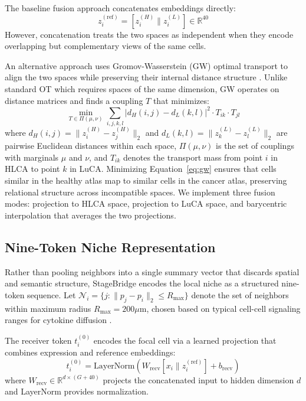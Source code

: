 \documentclass[conference]{IEEEtran}
\begin{document}
The baseline fusion approach concatenates embeddings directly:
\begin{equation}
z_i^{(\text{ref})} = [z_i^{(H)} \| z_i^{(L)}] \in \mathbb{R}^{40}
\label{eq:concat}
\end{equation}
However, concatenation treats the two spaces as independent when they encode overlapping but complementary views of the same cells.

An alternative approach uses Gromov-Wasserstein (GW) optimal transport to align the two spaces while preserving their internal distance structure \cite{Bunne2024-pl}. Unlike standard OT which requires spaces of the same dimension, GW operates on distance matrices and finds a coupling $T$ that minimizes:
\begin{equation}
\min_{T \in \Pi(\mu, \nu)} \sum_{i,j,k,l} |d_H(i,j) - d_L(k,l)|^2 \cdot T_{ik} \cdot T_{jl}
\label{eq:gw}
\end{equation}
where $d_H(i,j) = \|z_i^{(H)} - z_j^{(H)}\|_2$ and $d_L(k,l) = \|z_k^{(L)} - z_l^{(L)}\|_2$ are pairwise Euclidean distances within each space, $\Pi(\mu, \nu)$ is the set of couplings with marginals $\mu$ and $\nu$, and $T_{ik}$ denotes the transport mass from point $i$ in HLCA to point $k$ in LuCA. Minimizing Equation~\ref{eq:gw} ensures that cells similar in the healthy atlas map to similar cells in the cancer atlas, preserving relational structure across incompatible spaces. We implement three fusion modes: projection to HLCA space, projection to LuCA space, and barycentric interpolation that averages the two projections.

\subsection{Nine-Token Niche Representation}

Rather than pooling neighbors into a single summary vector that discards spatial and semantic structure, StageBridge encodes the local niche as a structured nine-token sequence. Let $\mathcal{N}_i = \{j : \|p_j - p_i\|_2 \leq R_{\max}\}$ denote the set of neighbors within maximum radius $R_{\max} = 200\mu\text{m}$, chosen based on typical cell-cell signaling ranges for cytokine diffusion \cite{Hong2025-jm}.

The receiver token $t_i^{(0)}$ encodes the focal cell via a learned projection that combines expression and reference embeddings:
\begin{equation}
t_i^{(0)} = \text{LayerNorm}(W_{\text{recv}} [x_i \| z_i^{(\text{ref})}] + b_{\text{recv}})
\label{eq:recv_token}
\end{equation}
where $W_{\text{recv}} \in \mathbb{R}^{d \times (G + 40)}$ projects the concatenated input to hidden dimension $d$ and LayerNorm provides normalization.
\end{document}
